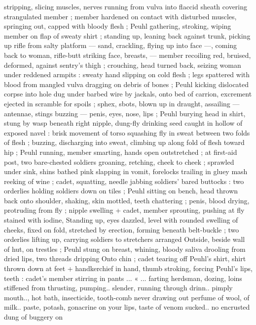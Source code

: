 stripping, slicing muscles, nerves running from vulva into flaccid %
sheath covering strangulated member ; member hardened on contact
with disturbed muscles, springing out, capped with bloody flesh ;
Peuhl gathering, stroking, wiping member on flap of sweaty shirt ;
standing up, leaning back against trunk, picking up rifle from salty
platform --- sand, crackling, flying up into face ---, coming back to
woman, rifle-butt striking face, breasts, --- member recoiling red,
bruised, deformed, against sentry’s thigh ; crouching, head turned
back, seizing woman under reddened armpits : sweaty hand slipping
on cold flesh ; legs spattered with blood from mangled vulva
dragging on debris of bones ; Peuhl kicking dislocated corpse into
hole dug under barbed wire by jackals, onto bed of carrion,
excrement ejected in scramble for spoils ; sphex, sbots, blown up in
draught, assailing --- antennae, stings buzzing --- penis, eyes, nose,
lips ; Peuhl burying head in shirt, stung by wasp beneath right
nipple, dung-fly drinking seed caught in hollow of exposed navel :
brisk movement of torso squashing fly in sweat between two folds of
flesh ; buzzing, discharging into sweat, climbing up along fold of
flesh toward hip ; Peuhl running, member smarting, hands open
outstretched ; at first-aid post, two bare-chested soldiers groaning,
retching, cheek to cheek ; sprawled under sink, shins bathed pink
slapping in vomit, forelocks trailing in gluey mash reeking of wine ;
cadet, squatting, needle jabbing soldiers’ bared buttocks : two
orderlies holding soldiers down on tiles ; Peuhl sitting on bench,
head thrown back onto shoulder, shaking, skin mottled, teeth
chattering ; penis, blood drying, protruding from fly ; nipple swelling
+ cadet, member sprouting, pushing at fly stained with iodine,
Standing up, eyes dazzled, level with rounded swelling of cheeks,
fixed on fold, stretched by erection, forming beneath belt-buckle ;
two orderlies lifting up, carrying soldiers to stretchers arranged
Outside, beside wall of hut, on trestles ; Peuhl stung on breast,
whining, bloody saliva drooling from dried lips, two threads dripping
Onto chin ; cadet tearing off Peuhl's shirt, shirt thrown down at feet
+ handkerchief in hand, thumb stroking, forcing Peuhl’s lips, teeth :
cadet's member stirring in pants ... « ... farting herdsman, dozing, %
loins stiffened from thrusting, pumping.. slender, running through
drinn.. pimply mouth.., hot bath, insecticide, tooth-comb never
drawing out perfume of wool, of milk.. paste, potash, gonacrine on
your lips, taste of venom sucked.. no encrusted dung of buggery on

